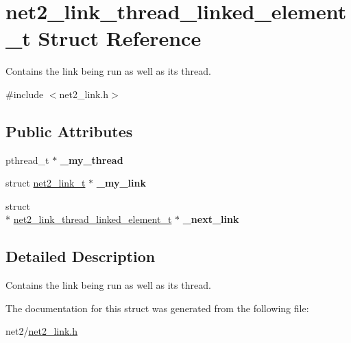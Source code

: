 \hypertarget{structnet2__link__thread__linked__element__t}{\section{net2\-\_\-link\-\_\-thread\-\_\-linked\-\_\-element\-\_\-t Struct Reference}
\label{structnet2__link__thread__linked__element__t}
}


Contains the link being run as well as its thread.  




{\ttfamily \#include $<$net2\-\_\-link.\-h$>$}

\subsection*{Public Attributes}
\begin{DoxyCompactItemize}
\item 
\hypertarget{structnet2__link__thread__linked__element__t_a4de69b752a1213f5cc228e1dd8f83b95}{pthread\-\_\-t $\ast$ {\bfseries \-\_\-my\-\_\-thread}}\label{structnet2__link__thread__linked__element__t_a4de69b752a1213f5cc228e1dd8f83b95}

\item 
\hypertarget{structnet2__link__thread__linked__element__t_a99b68d692f86432ad06502f28f89c175}{struct \hyperlink{structnet2__link__t}{net2\-\_\-link\-\_\-t} $\ast$ {\bfseries \-\_\-my\-\_\-link}}\label{structnet2__link__thread__linked__element__t_a99b68d692f86432ad06502f28f89c175}

\item 
\hypertarget{structnet2__link__thread__linked__element__t_aee53ad34cc55f3b702c5395a5728879d}{struct \\*
\hyperlink{structnet2__link__thread__linked__element__t}{net2\-\_\-link\-\_\-thread\-\_\-linked\-\_\-element\-\_\-t} $\ast$ {\bfseries \-\_\-next\-\_\-link}}\label{structnet2__link__thread__linked__element__t_aee53ad34cc55f3b702c5395a5728879d}

\end{DoxyCompactItemize}


\subsection{Detailed Description}
Contains the link being run as well as its thread. 

The documentation for this struct was generated from the following file\-:\begin{DoxyCompactItemize}
\item 
net2/\hyperlink{net2__link_8h}{net2\-\_\-link.\-h}\end{DoxyCompactItemize}
